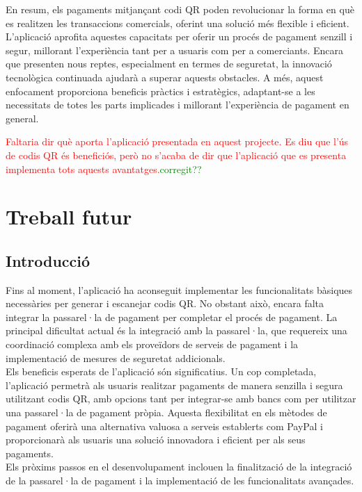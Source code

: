 \documentclass[a4paper,12pt,twoside]{ThesisStyle}
\newcommand{\pau}[1]{\textcolor{red}{#1}}
\newcommand{\sudan}[1]{\textcolor{green}{#1}}
\begin{document}
En resum, els pagaments mitjançant codi QR poden revolucionar la forma en què es realitzen les transaccions comercials, oferint una solució més flexible i eficient. L'aplicació aprofita aquestes capacitats per oferir un procés de pagament senzill i segur, millorant l'experiència tant per a usuaris com per a comerciants. Encara que presenten nous reptes, especialment en termes de seguretat, la innovació tecnològica continuada ajudarà a superar aquests obstacles. A més, aquest enfocament proporciona beneficis pràctics i estratègics, adaptant-se a les necessitats de totes les parts implicades i millorant l'experiència de pagament en general.


\pau{Faltaria dir què aporta l'aplicació presentada en aquest projecte. Es diu que l'ús de codis QR és beneficiós, però no s'acaba de dir que l'aplicació que es presenta implementa tots aquests avantatges.}\sudan{corregit??}




\chapter{Treball futur}
\label{chp:treballfutur}

\section{Introducció}
\label{sec:Introducció}

Fins al moment, l'aplicació ha aconseguit implementar les funcionalitats bàsiques necessàries per generar i escanejar codis QR. No obstant això, encara falta integrar la passarel·la de pagament per completar el procés de pagament. La principal dificultat actual és la integració amb la passarel·la, que requereix una coordinació complexa amb els proveïdors de serveis de pagament i la implementació de mesures de seguretat addicionals.\\

Els beneficis esperats de l'aplicació són significatius. Un cop completada, l'aplicació permetrà als usuaris realitzar pagaments de manera senzilla i segura utilitzant codis QR, amb opcions tant per integrar-se amb bancs com per utilitzar una passarel·la de pagament pròpia. Aquesta flexibilitat en els mètodes de pagament oferirà una alternativa valuosa a serveis establerts com PayPal i proporcionarà als usuaris una solució innovadora i eficient per als seus pagaments.\\

Els pròxims passos en el desenvolupament inclouen la finalització de la integració de la passarel·la de pagament i la implementació de les funcionalitats avançades.
\end{document}
